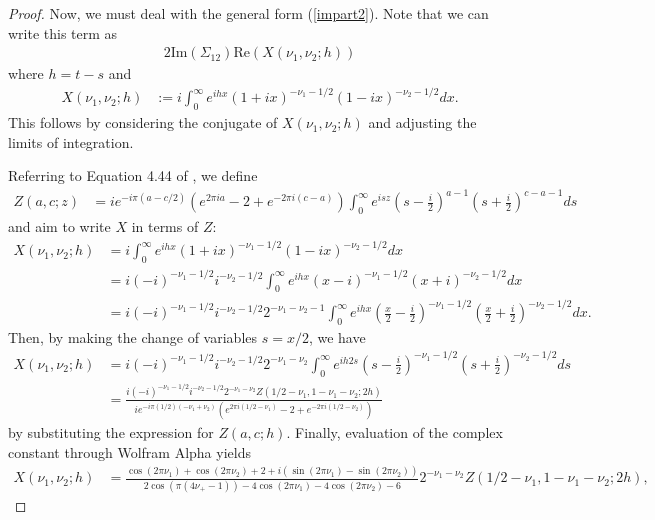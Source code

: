 \documentclass[11pt]{article}
\begin{document}
\begin{proof}

Now, we must deal with the general form (\ref{impart2}). Note that we can write this term as \begin{align*}
2\textrm{Im}(\Sigma_{12}) \textrm{Re}(X(\nu_{1}, \nu_{2};h))
\end{align*}where $h = t-s$ and \begin{align*}
X(\nu_{1}, \nu_{2};h) &:= i \int_0^\infty e^{ihx}(1 + ix)^{-\nu_1 - 1/2}(1 - ix)^{-\nu_2 - 1/2} dx.
\end{align*}This follows by considering the conjugate of $X(\nu_{1}, \nu_{2};h)$ and adjusting the limits of integration. 

Referring to Equation 4.44 of \cite{babister_transcendental_1967}, we define \begin{align*}
Z(a,c;z) &= ie^{-i\pi(a - c/2)}(e^{2\pi i a}- 2 + e^{-2\pi i(c-a)})\int_0^\infty e^{isz}\left(s-\frac{i}{2}\right)^{a-1}\left(s + \frac{i}{2}\right)^{c-a-1} ds 
\end{align*}and aim to write $X$ in terms of $Z$:
\begin{align*}
X(\nu_1, \nu_2; h) &= i\int_0^\infty e^{ihx} (1 + ix)^{-\nu_1 - 1/2}(1 -ix)^{-\nu_2-1/2} dx \\
&=i(-i)^{-\nu_1 - 1/2}i^{-\nu_2 - 1/2} \int_0^\infty e^{ihx}(x-i)^{-\nu_1 - 1/2} (x + i)^{-\nu_2 - 1/2} dx \\
&=i(-i)^{-\nu_1 - 1/2}i^{-\nu_2 - 1/2} 2^{-\nu_1 - \nu_2 - 1}\int_0^\infty e^{ihx}\left(\frac{x}{2}-\frac{i}{2}\right)^{-\nu_1 - 1/2} \left(\frac{x}{2} + \frac{i}{2}\right)^{-\nu_2 - 1/2} dx.\end{align*} Then, by making the change of variables $s = x/2$, we have
\begin{align*}
X(\nu_1, \nu_2; h)&=i(-i)^{-\nu_1 - 1/2}i^{-\nu_2 - 1/2} 2^{-\nu_1 - \nu_2}\int_0^\infty e^{ih2s}\left(s-\frac{i}{2}\right)^{-\nu_1 - 1/2} \left(s + \frac{i}{2}\right)^{-\nu_2 - 1/2} ds\\
&=\frac{i(-i)^{-\nu_1 - 1/2}i^{-\nu_2 - 1/2} 2^{-\nu_1 - \nu_2}Z(1/2 - \nu_1, 1- \nu_1 - \nu_2; 2h)}{ie^{-i \pi (1/2)(-\nu_1 +\nu_2)}(e^{2\pi i (1/2 - \nu_1)} - 2+ e^{-2\pi i (1/2 - \nu_2)}) }\end{align*}by substituting the expression for $Z(a,c;h)$. Finally, evaluation of the complex constant through Wolfram Alpha yields \begin{align*}
X(\nu_1, \nu_2; h) &= \frac{\cos(2 \pi \nu_1) + \cos(2\pi\nu_2) + 2 +i (\sin(2\pi \nu_1) - \sin(2\pi \nu_2))}{2\cos(\pi (4\nu_+-1)) - 4\cos(2\pi \nu_1) - 4 \cos(2\pi \nu_2) - 6}2^{-\nu_1 - \nu_2}Z(1/2 - \nu_1, 1- \nu_1 - \nu_2; 2h),

\end{align*}
\end{proof}
\end{document}
